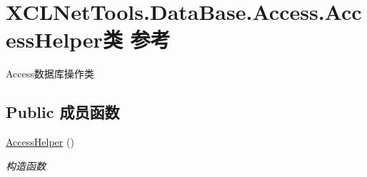 \hypertarget{class_x_c_l_net_tools_1_1_data_base_1_1_access_1_1_access_helper}{\section{X\-C\-L\-Net\-Tools.\-Data\-Base.\-Access.\-Access\-Helper类 参考}
\label{class_x_c_l_net_tools_1_1_data_base_1_1_access_1_1_access_helper}
}


Access数据库操作类  


\subsection*{Public 成员函数}
\begin{DoxyCompactItemize}
\item 
\hyperlink{class_x_c_l_net_tools_1_1_data_base_1_1_access_1_1_access_helper_ab5ab0cd6ee3cd8c950c3289e62a22238}{Access\-Helper} ()
\begin{DoxyCompactList}\small\item\em 构造函数 \end{DoxyCompactList}\end{DoxyCompactItemize}
